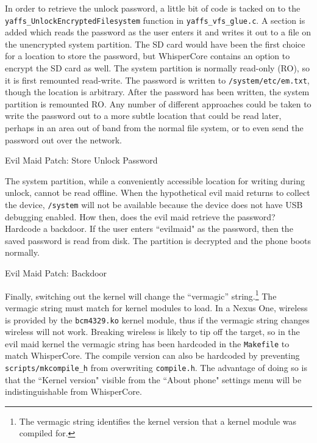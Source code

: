 In order to retrieve the unlock password, a little bit of code is tacked on to the \texttt{yaffs\_UnlockEncryptedFilesystem}
function in \texttt{yaffs\_vfs\_glue.c}. A section is added which reads the password as the user enters it and writes it out to a
file on the unencrypted system partition.  The SD card would have been the first choice for a location to store the password, but
WhisperCore contains an option to encrypt the SD card as well. The system partition is normally read-only (RO), so it is first
remounted read-write. The password is written to \texttt{/system/etc/em.txt}, though the location is arbitrary. After the password
has been written, the system partition is remounted RO. Any number of different approaches could be taken to write the password out
to a more subtle location that could be read later, perhaps in an area out of band from the normal file system, or to even send the
password out over the network. 

\begin{table}[htb]

\label{tab:storepass}
\caption{Evil Maid Patch: Store Unlock Password}
\end{table}

The system partition, while a conveniently accessible location for writing during unlock, cannot be read offline.  When the
hypothetical evil maid returns to collect the device, \texttt{/system} will not be available because the device does not have USB
debugging enabled.  How then, does the evil maid retrieve the password? Hardcode a backdoor.  If the user enters ``evilmaid" as the
password, then the saved password is read from disk.  The partition is decrypted and the phone boots normally. 

\begin{table}[htb]

\label{tab:backdoor}
\caption{Evil Maid Patch: Backdoor}
\end{table}

Finally, switching out the kernel will change the ``vermagic'' string.\footnote{The vermagic string identifies the kernel version
that a kernel module was compiled for.} The vermagic string must match for kernel modules to load.  In a Nexus One, wireless is
provided by the \texttt{bcm4329.ko} kernel module, thus if the vermagic string changes wireless will not work.  Breaking wireless is
likely to tip off the target, so in the evil maid kernel the vermagic string has been hardcoded in the \texttt{Makefile} to match
WhisperCore.  The compile version can also be hardcoded by preventing \texttt{scripts/mkcompile\_h} from overwriting
\texttt{compile.h}.  The advantage of doing so is that the ``Kernel version" visible from the ``About phone" settings menu will be
indistinguishable from WhisperCore.

